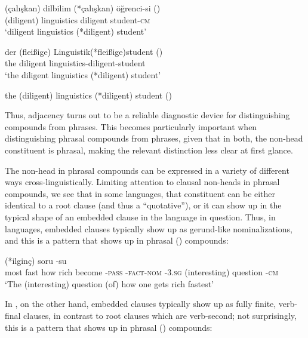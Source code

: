 \documentclass[output=paper]{LSP/langsci}
\begin{document}
\ea\label{ex:t3}
\ea\label{ex:t3a} 
	\gll 	(\c{c}al{\i}\c{s}kan)	dilbilim		(*\c{c}al{\i}\c{s}kan)	ö\u{g}renci-si	()\\
                (diligent)	linguistics	   diligent	student-\textsc{cm}\\
\glt `diligent linguistics (*diligent) student'


\ex\label{ex:t3b}
		\gll 	der 	(fleißige) 	Linguistik(*fleißige)student		()\\
	the  	diligent		linguistics-diligent-student\\
\glt	`the diligent linguistics (*diligent) student'

\ex\label{ex:t3c}
 	 the 	(diligent) 	linguistics (*diligent)        student		()\\
\z
\z

Thus, adjacency turns out to be a reliable diagnostic device for
distinguishing compounds from phrases. This becomes particularly
important when distinguishing phrasal compounds from phrases, given
that in both, the non-head constituent is phrasal, making the relevant
distinction less clear at first glance.

The non-head in phrasal compounds can be expressed in a variety of different
ways cross-linguistically. Limiting attention to clausal non-heads in
phrasal compounds, we see that in some languages, that constituent can
be either identical to a root clause (and thus a ``quotative''), or it
can show up in the typical shape of an embedded clause in the language
in question. Thus, in  languages, embedded clauses typically
show up as gerund-like nominalizations, and this is a pattern that
shows up in  phrasal () compounds:

\ea\label{ex:t4}
		(*ilgin\c{c})	soru	-su\\
	most  fast       how    rich       become \textsc{-pass} \textsc{-fact-nom} \textsc{-3.sg}
        (interesting)   question -\textsc{cm}\\
\glt	`The (interesting) question (of) how one gets rich fastest'
\z

        In , on the other hand, embedded clauses typically show
        up as fully finite, verb-final clauses, in contrast to root
        clauses which are verb-second; not surprisingly, this is a
        pattern that shows up in  phrasal ()
        compounds:
\end{document}
